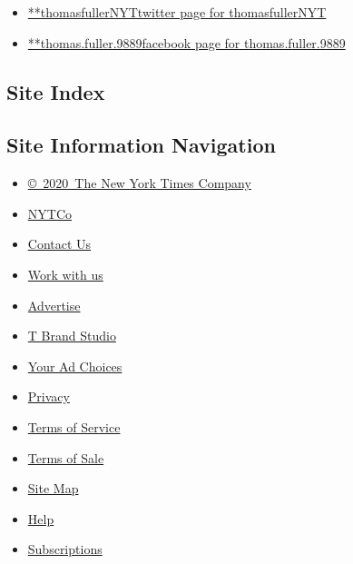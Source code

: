 \begin{itemize}
\tightlist
\item
  \href{https://twitter.com/thomasfullerNYT}{**thomasfullerNYTtwitter
  page for thomasfullerNYT}
\item
  \href{https://www.facebookcorewwwi.onion/thomas.fuller.9889}{**thomas.fuller.9889facebook
  page for thomas.fuller.9889}
\end{itemize}

\hypertarget{site-index}{%
\subsection{Site Index}\label{site-index}}

\hypertarget{site-information-navigation}{%
\subsection{Site Information
Navigation}\label{site-information-navigation}}

\begin{itemize}
\tightlist
\item
  \href{https://help.nytimes3xbfgragh.onion/hc/en-us/articles/115014792127-Copyright-notice}{©~2020~The
  New York Times Company}
\end{itemize}

\begin{itemize}
\tightlist
\item
  \href{https://www.nytco.com/}{NYTCo}
\item
  \href{https://help.nytimes3xbfgragh.onion/hc/en-us/articles/115015385887-Contact-Us}{Contact
  Us}
\item
  \href{https://www.nytco.com/careers/}{Work with us}
\item
  \href{https://nytmediakit.com/}{Advertise}
\item
  \href{http://www.tbrandstudio.com/}{T Brand Studio}
\item
  \href{https://www.nytimes3xbfgragh.onion/privacy/cookie-policy\#how-do-i-manage-trackers}{Your
  Ad Choices}
\item
  \href{https://www.nytimes3xbfgragh.onion/privacy}{Privacy}
\item
  \href{https://help.nytimes3xbfgragh.onion/hc/en-us/articles/115014893428-Terms-of-service}{Terms
  of Service}
\item
  \href{https://help.nytimes3xbfgragh.onion/hc/en-us/articles/115014893968-Terms-of-sale}{Terms
  of Sale}
\item
  \href{https://spiderbites.nytimes3xbfgragh.onion}{Site Map}
\item
  \href{https://help.nytimes3xbfgragh.onion/hc/en-us}{Help}
\item
  \href{https://www.nytimes3xbfgragh.onion/subscription?campaignId=37WXW}{Subscriptions}
\end{itemize}
